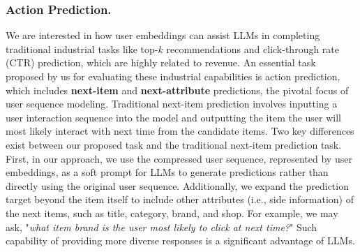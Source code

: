 

\subsubsection{\textbf{Action Prediction.}}
We are interested in how user embeddings can assist LLMs in completing traditional industrial tasks like top-$k$ recommendations and click-through rate (CTR) prediction, which are highly related to revenue.
An essential task proposed by us for evaluating these industrial capabilities is action prediction, which includes \textbf{next-item} and \textbf{next-attribute} predictions, the pivotal focus of user sequence modeling.
Traditional next-item prediction involves inputting a user interaction sequence into the model and outputting the item the user will most likely interact with next time from the candidate items.
Two key differences exist between our proposed task and the traditional next-item prediction task.
First, in our approach, we use the compressed user sequence, represented by user embeddings, as a soft prompt for LLMs to generate predictions rather than directly using the original user sequence.
Additionally, we expand the prediction target beyond the item itself to include other attributes (i.e., side information) of the next items, such as title, category, brand, and shop. 
For example, we may ask, "\textit{what item brand is the user most likely to click at next time?}"
Such capability of providing more diverse responses is a significant advantage of LLMs.


